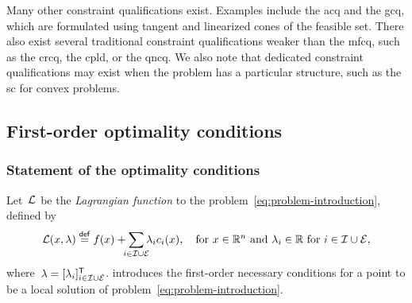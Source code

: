 Many other constraint qualifications exist.
Examples include the \gls{acq} and the \gls{gcq}, which are formulated using tangent and linearized cones of the feasible set.
There also exist several traditional constraint qualifications weaker than the \gls{mfcq}, such as the \gls{crcq}, the \gls{cpld}, or the \gls{qncq}.
We also note that dedicated constraint qualifications may exist when the problem has a particular structure, such as the \gls{sc} for convex problems.

\subsection{First-order optimality conditions}

\subsubsection{Statement of the optimality conditions}

Let~$\lag$ be the \emph{Lagrangian function} to the problem~\cref{eq:problem-introduction}, defined by
\begin{equation*}
    \lag(x, \lambda) \eqdef \obj(x) + \sum_{\mathclap{i \in \iub \cup \ieq}} \lambda_i \con{i}(x), \quad \text{for~$x \in \R^n$ and~$\lambda_i \in \R$ for~$i \in \iub \cup \ieq$},
\end{equation*}
where~$\lambda = [\lambda_i]_{i \in \mathcal{I} \cup \mathcal{E}}^{\mathsf{T}}$.
 introduces the first-order necessary conditions for a point to be a local solution of problem~\cref{eq:problem-introduction}.

